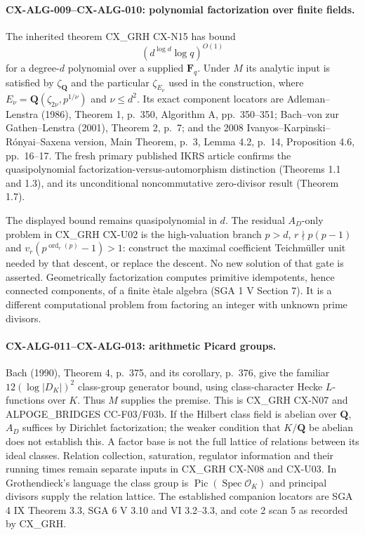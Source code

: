 \documentclass[11pt,a4paper]{article}
\begin{document}
\paragraph{CX-ALG-009--CX-ALG-010: polynomial factorization over finite fields.}
The inherited theorem CX\_GRH CX-N15 has bound
\[
                 (d^{\log d}\log q)^{O(1)}
\]
for a degree-$d$ polynomial over a supplied $\mathbf F_q$. Under $M$ its
analytic input is satisfied by $\zeta_{\mathbf Q}$ and the particular
$\zeta_{E_\nu}$ used in the construction, where
$E_\nu=\mathbf Q(\zeta_{2\nu},p^{1/\nu})$ and $\nu\leq d^2$.
Its exact component locators are Adleman--Lenstra (1986), Theorem 1, p.~350,
Algorithm A, pp.~350--351; Bach--von zur Gathen--Lenstra (2001), Theorem 2,
p.~7; and the 2008 Ivanyos--Karpinski--R\'onyai--Saxena version, Main Theorem,
p.~3, Lemma 4.2, p.~14, Proposition 4.6, pp.~16--17.
The fresh primary published IKRS article confirms the quasipolynomial
factorization-versus-automorphism distinction (Theorems 1.1 and 1.3), and
its unconditional noncommutative zero-divisor result (Theorem 1.7).

The displayed bound remains quasipolynomial in $d$. The residual $A_D$-only
problem in CX\_GRH CX-U02 is the high-valuation branch
$p>d$, $r\nmid p(p-1)$ and
$v_r(p^{\operatorname{ord}_r(p)}-1)>1$: construct the maximal coefficient
Teichm\"uller unit needed by that descent, or replace the descent. No new
solution of that gate is asserted. Geometrically factorization computes
primitive idempotents, hence connected components, of a finite \`etale
algebra (SGA 1 V Section 7). It is a different computational problem from
factoring an integer with unknown prime divisors.

\paragraph{CX-ALG-011--CX-ALG-013: arithmetic Picard groups.}
Bach (1990), Theorem 4, p.~375, and its corollary, p.~376, give the familiar
$12(\log|D_K|)^2$ class-group generator bound, using class-character Hecke
$L$-functions over $K$. Thus $M$ supplies the premise. This is CX\_GRH
CX-N07 and ALPOGE\_BRIDGES CC-F03/F03b. If the Hilbert class field is
abelian over $\mathbf Q$, $A_D$ suffices by Dirichlet factorization; the
weaker condition that $K/\mathbf Q$ be abelian does not establish this.
A factor base is not the full lattice of relations between its ideal
classes. Relation collection, saturation, regulator information and their
running times remain separate inputs in CX\_GRH CX-N08 and CX-U03.
In Grothendieck's language the class group is
$\operatorname{Pic}(\operatorname{Spec}\mathcal O_K)$ and principal divisors
supply the relation lattice. The established companion locators are SGA 4
IX Theorem 3.3, SGA 6 V 3.10 and VI 3.2--3.3, and cote 2 scan 5 as recorded
by CX\_GRH.
\end{document}
